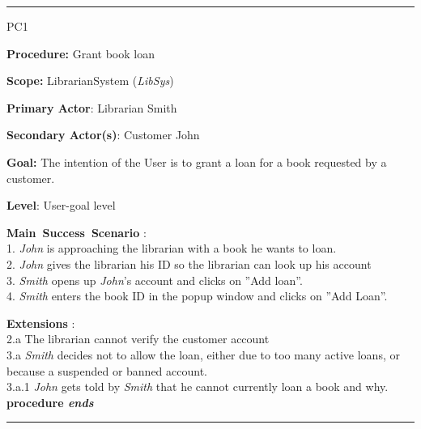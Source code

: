 \vspace{0.5cm}
\hrule
\begin{lyxlist}{PC1}
\small{
\item [\textbf{Procedure:}] Grant book loan
\item [\textbf{Scope:}] LibrarianSystem (\emph{LibSys})
\item [\textbf{Primary Actor}:] Librarian Smith
\item [\textbf{Secondary Actor(s)}:] Customer John
\item [\textbf{Goal:}] The intention of the User is to grant a loan for a book
requested by a customer.
\item [\textbf{Level}:] User-goal level
\item [\textbf{Main~Success~Scenario}]:\\
1. \emph{John} is approaching the librarian with a book he wants to loan. \\
2. \emph{John} gives the librarian his ID so the librarian can look up his
account\\
3. \emph{Smith} opens up \emph{John}'s account and clicks on ''Add loan''. \\
4. \emph{Smith} enters the book ID in the popup window and clicks on ''Add
Loan''.\\

\item [\textbf{Extensions}]:\\
2.a The librarian cannot verify the customer account\\
3.a \emph{Smith} decides not to allow the loan, either due to too many active
loans, or because a suspended or banned account.\\
\hspace*{0.5cm} 3.a.1 \emph{John} gets told by \emph{Smith} that he cannot
currently loan a book and why.\\ 
\hspace*{0.5cm} \textbf{procedure \emph{ends}}

}

\end{lyxlist}
\hrule

%


